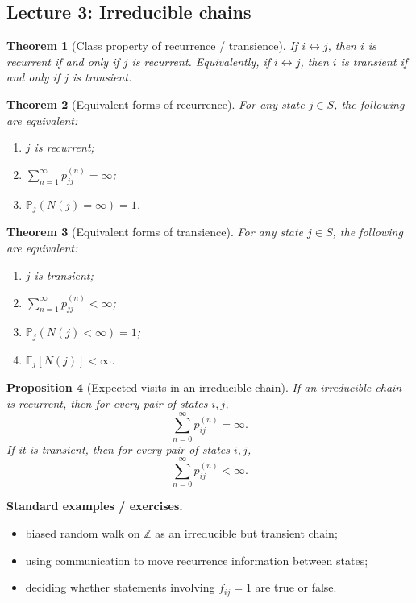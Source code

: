 \documentclass[11pt]{article}
\newtheorem{theorem}{Theorem}[section]
\newtheorem{proposition}[theorem]{Proposition}
\theoremstyle{definition}
\begin{document}
\subsection{Lecture 3: Irreducible chains}

\begin{theorem}[Class property of recurrence / transience]
If $i\leftrightarrow j$, then $i$ is recurrent if and only if $j$ is recurrent. Equivalently, if $i\leftrightarrow j$, then $i$ is transient if and only if $j$ is transient.
\end{theorem}

\begin{theorem}[Equivalent forms of recurrence]
For any state $j\in S$, the following are equivalent:
\begin{enumerate}[label=(\roman*)]
    \item $j$ is recurrent;
    \item $\sum_{n=1}^{\infty} p_{jj}^{(n)}=\infty$;
    \item $\mathbb P_j(N(j)=\infty)=1$.
\end{enumerate}
\end{theorem}

\begin{theorem}[Equivalent forms of transience]
For any state $j\in S$, the following are equivalent:
\begin{enumerate}[label=(\roman*)]
    \item $j$ is transient;
    \item $\sum_{n=1}^{\infty} p_{jj}^{(n)}<\infty$;
    \item $\mathbb P_j(N(j)<\infty)=1$;
    \item $\mathbb E_j[N(j)]<\infty$.
\end{enumerate}
\end{theorem}

\begin{proposition}[Expected visits in an irreducible chain]
If an irreducible chain is recurrent, then for every pair of states $i,j$,
\[
\sum_{n=0}^{\infty} p_{ij}^{(n)}=\infty.
\]
If it is transient, then for every pair of states $i,j$,
\[
\sum_{n=0}^{\infty} p_{ij}^{(n)}<\infty.
\]
\end{proposition}

\textbf{Standard examples / exercises.}
\begin{itemize}[leftmargin=2em]
    \item biased random walk on $\mathbb Z$ as an irreducible but transient chain;
    \item using communication to move recurrence information between states;
    \item deciding whether statements involving $f_{ij}=1$ are true or false.
\end{itemize}
\end{document}
